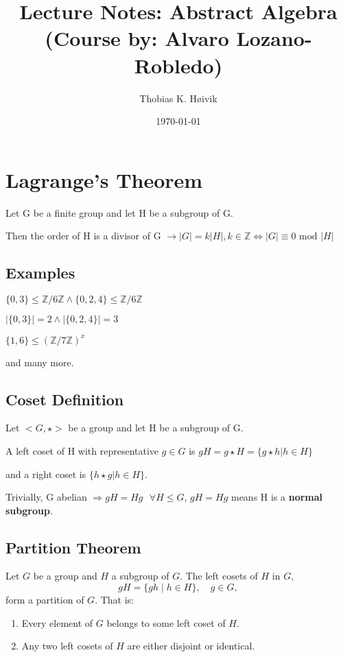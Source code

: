 \documentclass[12pt]{article}
\title{Lecture Notes: Abstract Algebra (Course by: Alvaro Lozano-Robledo)}
\author{Thobias K. Høivik}
\date{\today}
\theoremstyle{plain}
\begin{document}
\maketitle

\section*{Lagrange's Theorem}
Let G be a finite group and let H be a subgroup of G.

\noindent
Then the order of H is a divisor of G \(\rightarrow |G| = k|H|, k \in \mathbb Z
\Leftrightarrow |G| \equiv 0 \text{ mod } |H|
\)

\subsection*{Examples}
\(\{0, 3\} \leq \mathbb Z / 6\mathbb Z \land 
\{0, 2, 4\} \leq \mathbb Z / 6\mathbb Z
\) 

\noindent 
\(|\{0,3\}| = 2 \land |\{0,2,4\}| = 3\)

\noindent 
\( \{1,6\} \leq (\mathbb Z / 7\mathbb Z)^x\)

\noindent 
and many more.

\subsection*{Coset Definition}
Let \(<G,\star>\) be a group and let H be a subgroup of G. 

\noindent 
A left coset of H with representative \(g \in G\) is \(gH = g\star H = 
\{g \star h | h \in H\}
\)

\noindent 
and a right coset is \(\{h \star g |h \in H\}\). 

\noindent 
Trivially, G abelian \(\Rightarrow gH = Hg \text{ } \forall H \leq G\), 
\(gH = Hg\) means H is a \textbf{normal subgroup}.

\subsection*{Partition Theorem} 
Let \( G \) be a group and \( H \) a subgroup of \( G \). The left cosets of \( H \) in \( G \),
\[
gH = \{ gh \mid h \in H \}, \quad g \in G,
\]
form a partition of \( G \). That is:
\begin{enumerate}
    \item Every element of \( G \) belongs to some left coset of \( H \).
    \item Any two left cosets of \( H \) are either disjoint or identical.
\end{enumerate}
\end{document}
